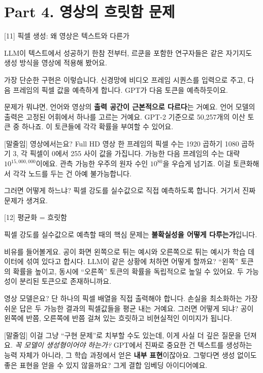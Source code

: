 \documentclass[aspectratio=169,10pt]{beamer}
\newenvironment{script}{%
  \footnotesize
  \setlength{\parskip}{0.5em}
  \setlength{\parindent}{0pt}
}{}
\begin{document}
\section{Part 4. 영상의 흐릿함 문제}

\begin{frame}{[11] 픽셀 생성: 왜 영상은 텍스트와 다른가}
\begin{script}
LLM이 텍스트에서 성공하기 한참 전부터, 르쿤을 포함한 연구자들은 같은 자기지도 생성 방식을 영상에 적용해 봤어요.

가장 단순한 구현은 이렇습니다. 신경망에 비디오 프레임 시퀀스를 입력으로 주고, 다음 프레임의 픽셀 값을 예측하게 합니다. GPT가 다음 토큰을 예측하듯이요.

문제가 뭐냐면, 언어와 영상의 \textbf{출력 공간이 근본적으로 다르다}는 거예요. 언어 모델의 출력은 고정된 어휘에서 하나를 고르는 거예요. GPT-2 기준으로 50,257개의 이산 토큰 중 하나죠. 이 토큰들에 각각 확률을 부여할 수 있어요.

[말줄임] 영상에서는요? Full HD 영상 한 프레임의 픽셀 수는 1920 곱하기 1080 곱하기 3, 각 픽셀이 0에서 255 사이 값을 가집니다. 가능한 다음 프레임의 수는 대략 $10^{15,000,000}$이에요. 관측 가능한 우주의 원자 수인 $10^{80}$을 우습게 넘기죠. 이걸 토큰화해서 각각 노드를 두는 건 아예 불가능합니다.

그러면 어떻게 하느냐? 픽셀 강도를 실수값으로 직접 예측하도록 합니다. 거기서 진짜 문제가 생겨요.
\end{script}
\end{frame}

\begin{frame}{[12] 평균화 = 흐릿함}
\begin{script}
픽셀 강도를 실수값으로 예측할 때의 핵심 문제는 \textbf{불확실성을 어떻게 다루는가}입니다.

비유를 들어볼게요. 공이 화면 왼쪽으로 튀는 예시와 오른쪽으로 튀는 예시가 학습 데이터에 섞여 있다고 합시다. LLM이 같은 상황에 처하면 어떻게 할까요? ``왼쪽'' 토큰의 확률을 높이고, 동시에 ``오른쪽'' 토큰의 확률을 독립적으로 높일 수 있어요. 두 가능성이 분리된 토큰으로 존재하니까요.

영상 모델은요? 단 하나의 픽셀 배열을 직접 출력해야 합니다. 손실을 최소화하는 가장 쉬운 답은 두 가능한 결과의 픽셀값들을 평균 내는 거예요. 그러면 어떻게 되냐? 공이 왼쪽에 반쯤, 오른쪽에 반쯤 걸쳐 있는 흐릿하고 비현실적인 이미지가 됩니다.

[말줄임] 이걸 그냥 ``구현 문제''로 치부할 수도 있는데, 이게 사실 더 깊은 질문을 던져요. \textit{꼭 모델이 생성형이어야 하는가?} GPT에서 진짜로 중요한 건 텍스트를 생성하는 능력 자체가 아니라, 그 학습 과정에서 얻은 \textbf{내부 표현}이잖아요. 그렇다면 생성 없이도 좋은 표현을 얻을 수 있지 않을까요? 그게 결합 임베딩 아이디어예요.
\end{script}
\end{frame}
\end{document}
